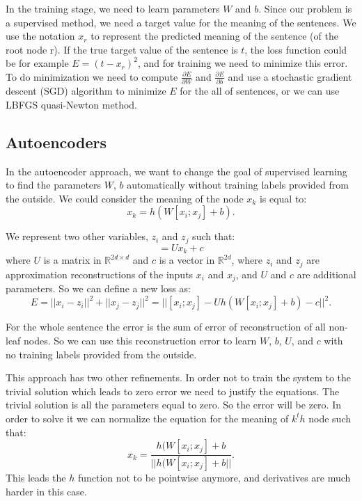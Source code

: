 \documentclass[twoside,12pt]{article}
\begin{document}
In the training stage, we need to learn parameters $W$ and $b$. Since our problem is a supervised method, we need a target value for the meaning of the sentences. We use the notation $x_r$ to represent the predicted meaning of the sentence (of the root node r). If the true target value of the sentence is $t$, the loss function could be for example $E=(t-x_r)^2$, and for training we need to minimize this error. To do minimization we need to compute $\frac{\partial{E}}{\partial{W}}$ and $\frac{\partial{E}}{\partial{b}}$ and use a stochastic gradient descent (SGD) algorithm to minimize $E$ for the all of sentences, or we can use LBFGS quasi-Newton method.  
\subsection{Autoencoders}
In the autoencoder approach, we want to change the goal of supervised learning to find the parameters $W$, $b$ automatically without training labels provided from the outside. We could consider the meaning of the node $x_k$ is equal to:
\begin{equation}
x_k=h(W[x_i;x_j]+b).
\end{equation}

We represent two other variables, $z_i$ and $z_j$ such that:
\begin{equation}
[z_i;z_j]=Ux_k+c
\end{equation}
where $U$ is a matrix in $\mathbb{R}^{2d\times d}$ and $c$ is a vector in $\mathbb{R}^{2d}$, where $z_i$ and $z_j$ are approximation reconstructions of the inputs $x_i$ and $x_j$, and $U$ and $c$ are additional parameters. So we can define a new loss as:
\begin{equation}
E=||x_i-z_i||^2+||x_j-z_j||^2=||[x_i;x_j]-Uh(W[x_i;x_j]+b)-c||^2.
\end{equation}

For the whole sentence the error is the sum of error of reconstruction of all non-leaf nodes. So we can use this reconstruction error to learn $W$, $b$, $U$, and $c$ with no training labels provided from the outside. 

This approach has two other refinements. In order not to train the system to the trivial solution which leads to zero error we need to justify the equations. The trivial solution is all the parameters equal to zero. So the error will be zero. In order to solve it we can normalize the equation for the meaning of $k^th$ node such that:
\begin{equation}
x_k = \frac{h(W[x_i;x_j]+b}{||h(W[x_i;x_j]+b||}.
\end{equation}
This leads the $h$ function not to be pointwise anymore, and derivatives are much harder in this case.
\end{document}
